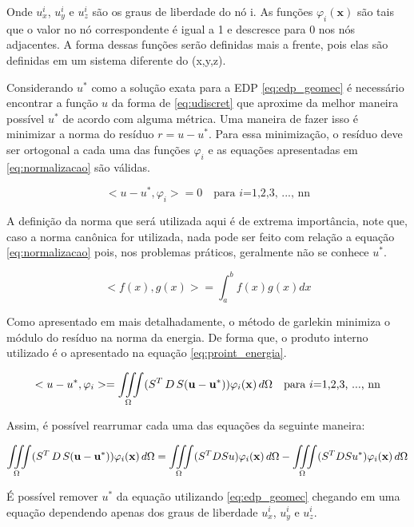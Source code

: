 Onde $u^i_x$, $u^i_y$ e $u^i_z$ são os graus de liberdade do nó i. As funções $\varphi_i(\mathbf{x})$ são tais que o valor no nó correspondente é igual a 1 e descresce para 0 nos nós adjacentes. A forma dessas funções serão definidas mais a frente, pois elas são definidas em um sistema diferente do (x,y,z).


Considerando $u^*$ como a solução exata para a EDP \ref{eq:edp_geomec} é necessário encontrar a função $u$ da forma de \ref{eq:udiscret} que aproxime da melhor maneira possível $u^*$ de acordo com alguma métrica. Uma maneira de fazer isso é minimizar a norma do resíduo $r = u-u^*$. Para essa minimização, o resíduo  deve ser ortogonal a cada uma das funções $\varphi_i$ e as equações apresentadas em \ref{eq:normalizacao} são válidas.


\begin{equation}\label{eq:normalizacao}
<u-u^*, \varphi_i> = 0   \quad  \text{para $i$=1,2,3, ..., nn}
\end{equation}

A definição da norma que será utilizada aqui é de extrema importância, note que, caso a norma canônica for utilizada, nada pode ser feito com relação a equação \ref{eq:normalizacao} pois, nos problemas práticos, geralmente não se conhece $u^*$.

\begin{equation}
    <f(x), g(x)> = \int^b_af(x)g(x) dx
\end{equation}

Como apresentado em \cite{CompGeomec} mais detalhadamente, o método de garlekin minimiza o módulo do resíduo na norma da energia. De forma que, o produto interno utilizado é o apresentado na equação \ref{eq:proint_energia}.



\begin{equation}
\label{eq:proint_energia}
<u-u^*, \varphi_i> = \iiint\limits_{\Omega} (S^T\,D\,S(\mathbf{u - u^*})) \varphi_i(\mathbf{x}) \, d\Omega \quad \text{para $i$=1,2,3, ..., nn}
\end{equation}

Assim, é possível rearrumar cada uma das equações da seguinte maneira:


\begin{equation}
\iiint\limits_{\Omega} (S^T\,D\,S(\mathbf{u - u^*})) \varphi_i(\mathbf{x}) \, d\Omega  =  \iiint\limits_{\Omega} (S^TDSu)\varphi_i(\mathbf{x}) \, d\Omega - \iiint\limits_{\Omega} (S^TDSu^*)\varphi_i(\mathbf{x}) \, d\Omega
\end{equation}

É possível remover $u^*$ da equação utilizando \ref{eq:edp_geomec} chegando em uma equação dependendo apenas dos graus de liberdade $u^i_x$, $u^i_y$ e $u^i_z$.

